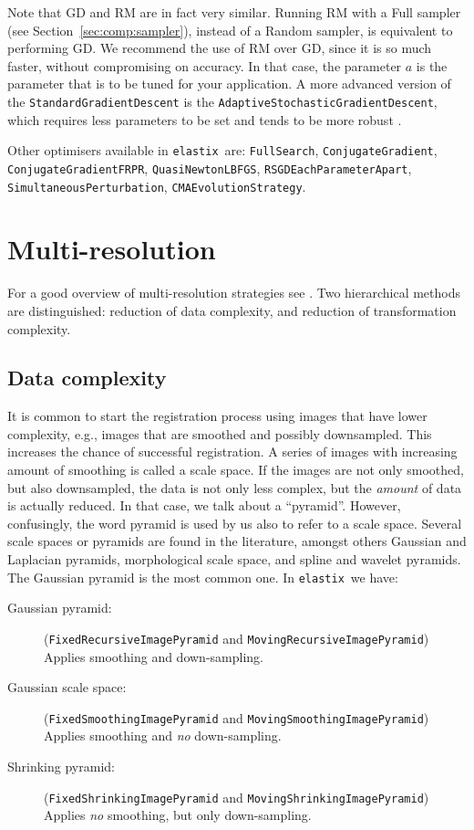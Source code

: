 \documentclass[]{report}
\newcommand{\elastix}{\texttt{elastix}}
\begin{document}
Note that GD and RM are in fact very similar. Running RM with a Full sampler
(see Section~\ref{sec:comp:sampler}), instead of a Random sampler, is
equivalent to performing GD. We recommend the use of RM over GD, since it is so
much faster, without compromising on accuracy. In that case, the parameter $a$
is the parameter that is to be tuned for your application. A more advanced
version of the \texttt{StandardGradientDescent} is the
\texttt{AdaptiveStochasticGradientDescent}, which requires less parameters to
be set and tends to be more robust \cite{Klein09}.

Other optimisers available in \elastix\ are: \texttt{FullSearch},
\texttt{ConjugateGradient}, \texttt{ConjugateGradientFRPR},
\texttt{QuasiNewtonLBFGS}, \texttt{RSGDEachParameterApart},
\texttt{SimultaneousPerturbation}, \texttt{CMAEvolutionStrategy}.

\section{Multi-resolution}\label{sec:comp:multiresolution}

For a good overview of multi-resolution strategies see
\citet{LesterEA99}. Two hierarchical methods are distinguished:
reduction of data complexity, and reduction of transformation
complexity.

\subsection{Data complexity}

It is common to start the registration process using images that have
lower complexity, e.g., images that are smoothed and possibly
downsampled. This increases the chance of successful registration. A
series of images with increasing amount of smoothing is called a
scale space. If the images are not only smoothed, but also
downsampled, the data is not only less complex, but the \emph{amount}
of data is actually reduced. In that case, we talk about a
``pyramid''. However, confusingly, the word pyramid is used by us
also to refer to a scale space. Several scale spaces or pyramids are
found in the literature, amongst others Gaussian and Laplacian
pyramids, morphological scale space, and spline and wavelet pyramids.
The Gaussian pyramid is the most common one. In \elastix\ we have:
\begin{description}
\item[Gaussian pyramid:] (\texttt{FixedRecursiveImagePyramid} and
\texttt{MovingRecursiveImagePyramid}) Applies smoothing and
down-sampling.

\item[Gaussian scale space:] (\texttt{FixedSmoothingImagePyramid} and
\texttt{MovingSmoothingImagePyramid}) Applies smoothing and
\emph{no} down-sampling.

\item[Shrinking pyramid:] (\texttt{FixedShrinkingImagePyramid} and
\texttt{MovingShrinkingImagePyramid}) Applies \emph{no} smoothing,
but only down-sampling.
\end{description}
\end{document}
